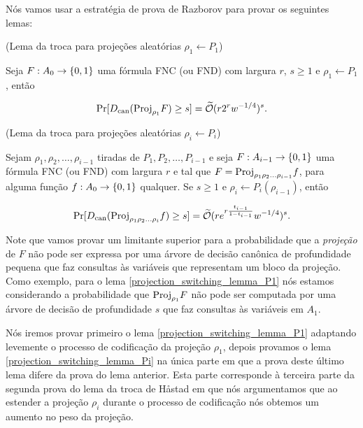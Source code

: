 Nós vamos usar a estratégia de prova de Razborov para provar os seguintes lemas:

\begin{lema} (Lema da troca para projeções aleatórias $\rho_{1} \leftarrow P_{1}$) \label{projection_switching_lemma_P1}

Seja $F: A_{0} \to \{0, 1\}$ uma fórmula FNC (ou FND) com largura $r$, $s \geq 1$ e $\rho_{1} \leftarrow P_{1}$, então

\begin{equation*}
	\Pr[D_{\text{can}}(\text{Proj}_{\rho_{1}}F) \geq s] = \widetilde{\mathcal{O}}(r2^{r}w^{-1/4})^{s}.
\end{equation*} 

\end{lema}

\begin{lema} (Lema da troca para projeções aleatórias $\rho_{i} \leftarrow P_{i}$) \label{projection_switching_lemma_Pi}

Sejam $\rho_{1}, \rho_{2}, \dots, \rho_{i - 1}$ tiradas de $P_{1}, P_{2}, \dots, P_{i - 1}$ e seja $F: A_{i - 1} \to \{0, 1\}$ uma fórmula FNC (ou FND) com largura $r$ e tal que $F = \text{Proj}_{\rho_{1}\rho_{2}\dots\rho_{i - 1}}f$, para alguma função $f: A_{0} \to \{0, 1\}$ qualquer. Se $s \geq 1$ e $\rho_{i} \leftarrow P_{i}(\rho_{i - 1})$, então

\begin{equation*}
	\Pr[D_{\text{can}}(\text{Proj}_{\rho_{1}\rho_{2}\dots\rho_{i}}f) \geq s]  = \widetilde{\mathcal{O}}(re^{r\frac{t_{i - 1}}{1 - t_{i - 1}}}w^{-1/4})^{s}.
\end{equation*}

\end{lema}

Note que vamos provar um limitante superior para a probabilidade que a \emph{projeção} de $F$ não pode ser expressa por uma árvore de decisão canônica de profundidade pequena que faz consultas às variáveis que representam um bloco da projeção. Como exemplo, para o lema \ref{projection_switching_lemma_P1} nós estamos considerando a probabilidade que $\text{Proj}_{\rho_{1}}F$ não pode ser computada por uma árvore de decisão de profundidade $s$ que faz consultas às variáveis em $A_{1}$.

Nós iremos provar primeiro o lema \ref{projection_switching_lemma_P1} adaptando levemente o processo de codificação da projeção $\rho_{1}$, depois provamos o lema \ref{projection_switching_lemma_Pi} na única parte em que a prova deste último lema difere da prova do lema anterior. Esta parte corresponde à terceira parte da segunda prova do lema da troca de Håstad em que nós argumentamos que ao estender a projeção $\rho_{i}$ durante o processo de codificação nós obtemos um aumento no peso da projeção.

